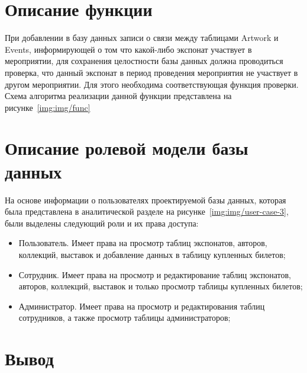 \clearpage

\section{Описание функции}

При добавлении в базу данных записи о связи между таблицами Artwork и Events, информирующей о том что какой-либо экспонат участвует в мероприятии, для сохранения целостности базы данных должна проводиться проверка, что данный экспонат в период проведения мероприятия не участвует в другом мероприятии. Для этого необходима соответствующая функция проверки. Схема алгоритма реализации данной функции представлена на рисунке~\ref{img:img/func}

\FloatBarrier
{}
\FloatBarrier


\section{Описание ролевой модели базы данных}

На основе информации о пользователях проектируемой базы данных, которая была представлена в аналитической разделе на рисунке~\ref{img:img/user-case-3}, были выделены следующий роли и их права доступа:

\begin{itemize}
	\item Пользователь. Имеет права на просмотр таблиц экспонатов, авторов, коллекций, выставок и добавление данных в таблицу купленных билетов;
	\item Сотрудник. Имеет права на просмотр и редактирование таблиц экспонатов, авторов, коллекций, выставок и только просмотр таблицы купленных билетов;
	\item Администратор. Имеет права на просмотр и редактирования таблиц сотрудников, а также просмотр таблицы администраторов; 
\end{itemize}





\section*{Вывод}

